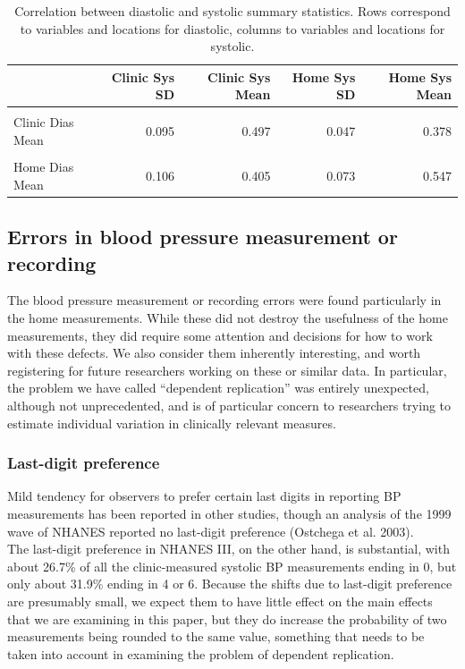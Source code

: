 \documentclass[
]{article}
\begin{document}
\begin{table}[!h]
\centering
\caption{\label{tab:SD-mean3}Correlation between diastolic and systolic summary statistics. Rows correspond to variables and locations for diastolic, columns to variables and locations for systolic.}
\centering
\begin{tabular}[t]{lrrrr}
\toprule
  & Clinic Sys SD & Clinic Sys Mean & Home Sys SD & Home Sys Mean\\
\midrule
\cellcolor{gray!10}{Clinic Dias SD} & \cellcolor{gray!10}{0.150} & \cellcolor{gray!10}{0.041} & \cellcolor{gray!10}{0.007} & \cellcolor{gray!10}{0.030}\\
Clinic Dias Mean & 0.095 & 0.497 & 0.047 & 0.378\\
\cellcolor{gray!10}{Home Dias SD} & \cellcolor{gray!10}{0.022} & \cellcolor{gray!10}{0.045} & \cellcolor{gray!10}{0.224} & \cellcolor{gray!10}{0.060}\\
Home Dias Mean & 0.106 & 0.405 & 0.073 & 0.547\\
\bottomrule
\end{tabular}
\end{table}

\subsection{Errors in blood pressure measurement or recording}\label{sec:errors}

The blood pressure measurement or recording errors were found particularly in the home measurements.
While these did not destroy the usefulness of the home measurements, they did require some attention and decisions for how to work with these defects.
We also consider them inherently interesting, and worth registering for future researchers working on these or similar data.
In particular, the problem we have called ``dependent replication'' was entirely unexpected, although not unprecedented, and is of particular concern to researchers trying to estimate individual variation in clinically relevant measures.

\subsubsection{Last-digit preference}\label{sec:lastdigit}

Mild tendency for observers to prefer certain last digits in reporting BP measurements has been reported in other studies, though an analysis of the 1999 wave of NHANES reported no last-digit preference (Ostchega et al. 2003).\\
The last-digit preference in NHANES III, on the other hand, is substantial, with about 26.7\% of all the clinic-measured systolic BP measurements ending in 0, but only about 31.9\% ending in 4 or 6. Because the shifts due to last-digit preference are presumably small, we expect them to have little effect on the main effects that we are examining in this paper, but they do increase the probability of two measurements being rounded to the same value, something that needs to be taken into account in examining the problem of dependent replication.
\end{document}
